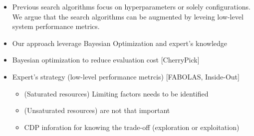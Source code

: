 \begin{itemize}
\item
  Previous search algorithms focus on hyperparameters or solely
  configurations. We argue that the search algorithms can be augmented
  by leveing low-level system performance metrics.
\item
  Our approach leverage Bayesian Optimization and expert's knowledge
\item
  Bayesian optimization to reduce evaluation cost {[}CherryPick{]}
\item
  Expert's strategy (low-level performance metrcis) {[}FABOLAS,
  Inside-Out{]}

  \begin{itemize}
  \item
    (Saturated resources) Limiting factors needs to be identified
  \item
    (Unsaturated resources) are not that important
  \item
    CDP inforation for knowing the trade-off (exploration or
    exploitation)
  \end{itemize}
\end{itemize}
\fi
